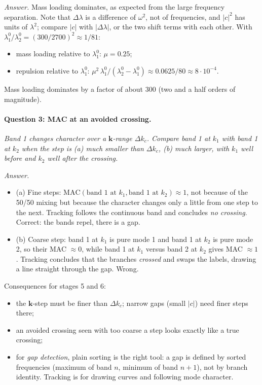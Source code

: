 \emph{Answer.} Mass loading dominates, as expected from the large frequency
separation. Note that $\Delta\lambda$ is a difference of $\omega^2$, not of
frequencies, and $|c|^2$ has units of $\lambda^2$; compare $|c|$ with
$|\Delta\lambda|$, or the two shift terms with each other. With
$\lambda_1^0/\lambda_2^0 = (300/2700)^2 \approx 1/81$:
\begin{itemize}
  \item mass loading relative to $\lambda_1^0$: $\mu = 0.25$;
  \item repulsion relative to $\lambda_1^0$:
        $\mu^2\,\lambda_1^0/(\lambda_2^0 - \lambda_1^0) \approx 0.0625/80 \approx 8\cdot 10^{-4}$.
\end{itemize}
Mass loading dominates by a factor of about 300 (two and a half orders of
magnitude).

\paragraph{Question 3: MAC at an avoided crossing.} \emph{Band 1 changes
character over a $\mathbf{k}$-range $\Delta k_c$. Compare band 1 at $k_1$ with
band 1 at $k_2$ when the step is (a) much smaller than $\Delta k_c$, (b) much
larger, with $k_1$ well before and $k_2$ well after the crossing.}

\emph{Answer.}
\begin{itemize}
  \item (a) Fine steps: $\mathrm{MAC}(\text{band 1 at } k_1, \text{band 1 at } k_2) \approx 1$,
        not because of the 50/50 mixing but because the character changes
        only a little from one step to the next. Tracking follows the
        continuous band and concludes \emph{no crossing}. Correct: the bands
        repel, there is a gap.
  \item (b) Coarse step: band 1 at $k_1$ is pure mode 1 and band 1 at $k_2$
        is pure mode 2, so their MAC $\approx 0$, while band 1 at $k_1$ versus
        band 2 at $k_2$ gives MAC $\approx 1$. Tracking concludes that the
        branches \emph{crossed} and swaps the labels, drawing a line straight
        through the gap. Wrong.
\end{itemize}
Consequences for stages 5 and 6:
\begin{itemize}
  \item the $\mathbf{k}$-step must be finer than $\Delta k_c$; narrow gaps
        (small $|c|$) need finer steps there;
  \item an avoided crossing seen with too coarse a step looks exactly like a
        true crossing;
  \item for \emph{gap detection}, plain sorting is the right tool: a gap is
        defined by sorted frequencies (maximum of band $n$, minimum of band
        $n+1$), not by branch identity. Tracking is for drawing curves and
        following mode character.
\end{itemize}

